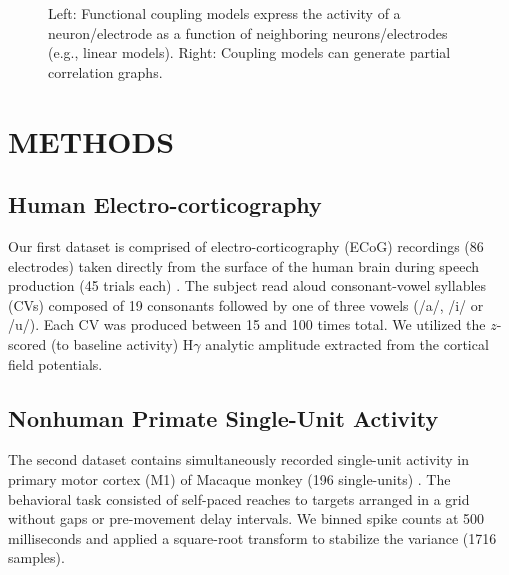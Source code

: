 \documentclass[letterpaper, 10 pt, conference]{ieeeconf}  %
\begin{document}
\begin{figure}[t]
    \centering
    \caption{Left: Functional coupling models express the activity of a neuron/electrode as a function of neighboring neurons/electrodes (e.g., linear models). Right: Coupling models can generate partial correlation graphs.}
    \label{fig:functional_coupling}
\end{figure}

\section{METHODS}
\subsection{Human Electro-corticography}
Our first dataset is comprised of electro-corticography (ECoG) recordings (86 electrodes) taken directly from the surface of the human brain during speech production (45 trials each) \cite{bouchard2013}. The subject read aloud consonant-vowel syllables (CVs) composed of 19 consonants followed by one of three vowels (/a/, /i/ or /u/). Each CV was produced between 15 and 100 times total.  We utilized the $z$-scored (to baseline activity) H$\gamma$ analytic amplitude extracted from the cortical field potentials.

\subsection{Nonhuman Primate Single-Unit Activity}
The second dataset contains simultaneously recorded single-unit activity in primary motor cortex (M1) of Macaque monkey (196 single-units) \cite{nhp}. The behavioral task consisted of self-paced reaches to targets arranged in a grid without gaps or pre-movement delay intervals. We binned spike counts at 500 milliseconds and applied a square-root transform to stabilize the variance (1716 samples).
\end{document}
